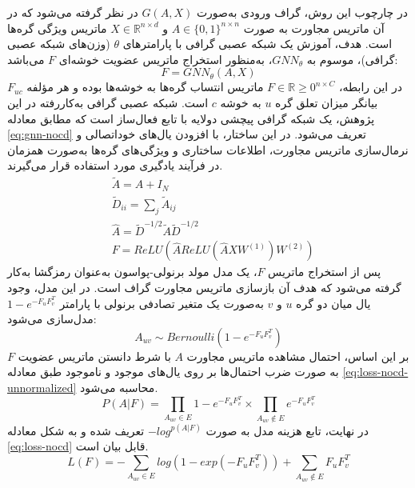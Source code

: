 در چارچوب این روش، گراف ورودی به‌صورت $G(A, X)$ در نظر گرفته می‌شود که در آن ماتریس مجاورت به صورت $A \in \{0,1\}^{n \times n}$ و $X \in \mathbb{R}^{n \times d}$ ماتریس ویژگی گره‌ها است. هدف، آموزش یک شبکه عصبی گرافی با پارامترهای $\theta$ (وزن‌های شبکه عصبی گرافی)، موسوم به $GNN_{\theta}$، به‌منظور استخراج ماتریس عضویت خوشه‌ای $F$ می‌باشد:
\begin{equation}
	F = GNN_{\theta}(A, X)
\end{equation}
در این رابطه، $F \in \mathbb{R}{\ge 0}^{n \times C}$ ماتریس انتساب گره‌ها به خوشه‌ها بوده و هر مؤلفه $F_{uc}$ بیانگر میزان تعلق گره $u$ به خوشه $c$ است. شبکه عصبی گرافی به‌کاررفته در این پژوهش، یک شبکه گرافی پیچشی دو‌لایه با تابع فعال‌ساز  است که مطابق معادله \ref{eq:gnn-nocd} تعریف می‌شود. در این ساختار، با افزودن یال‌های خوداتصالی و نرمال‌سازی ماتریس مجاورت، اطلاعات ساختاری و ویژگی‌های گره‌ها به‌صورت همزمان در فرآیند یادگیری مورد استفاده قرار می‌گیرند.
\begin{equation}
	\begin{aligned}
		& \tilde{A} = A + I_N \\
		& \tilde{D}_{ii} = \sum_{j} \tilde{A}_{ij} \\
		& \hat{A} = \tilde{D}^{-1/2}\tilde{A}\tilde{D}^{-1/2} \\
		& F = ReLU(\hat{A}ReLU(\hat{A}XW^{(1)})W^{(2)})
	\end{aligned}
	\label{eq:gnn-nocd}
\end{equation}
پس از استخراج ماتریس $F$، یک مدل مولد برنولی-پواسون به‌عنوان رمزگشا به‌کار گرفته می‌شود که هدف آن بازسازی ماتریس مجاورت گراف است. در این مدل، وجود یال میان دو گره $u$ و $v$ به‌صورت یک متغیر تصادفی برنولی با پارامتر $1-e^{-F_uF_v^T}$ مدل‌سازی می‌شود:
\begin{equation}
	A_{uv} \sim Bernoulli(1-e^{-F_uF_v^T})
\end{equation}
بر این اساس، احتمال مشاهده ماتریس مجاورت $A$ با شرط دانستن ماتریس عضویت $F$ به‌ صورت ضرب احتمال‌ها بر روی یال‌های موجود و ناموجود طبق معادله \ref{eq:loss-nocd-unnormalized} محاسبه می‌شود.
\begin{equation}
	P(A|F) = \prod_{A_{uv}\in E} 1-e^{-F_uF_v^T} \times \prod_{A_{uv}\notin E} e^{-F_uF_v^T}
	\label{eq:loss-nocd-unnormalized}
\end{equation}
در نهایت، تابع هزینه مدل به‌ صورت $-log^{p(A|F)}$ تعریف شده و به شکل معادله \ref{eq:loss-nocd} قابل بیان است.
\begin{equation}
	L(F)=-\sum_{A_{uv}\in E}
	​log(1-exp(-F_uF_v^T))+\sum_{A_{uv}\notin E}
	​F_uF_v^T
	\label{eq:loss-nocd}
\end{equation}
